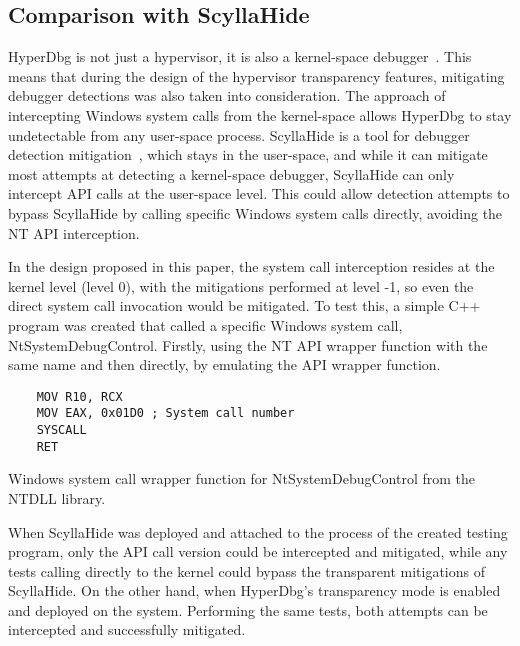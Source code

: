 \subsection{Comparison with ScyllaHide}\label{scyllahide-comparison}
HyperDbg is not just a hypervisor, it is also a kernel-space debugger~\cite{karvandi2022hyperdbg}. This means that during the design of 
the hypervisor transparency features, mitigating debugger detections was also taken into consideration. The approach of intercepting Windows system calls 
from the kernel-space allows HyperDbg to stay undetectable from any user-space process. ScyllaHide is a tool for debugger detection mitigation~\cite{scyllahide}, 
which stays in the user-space, and while it can mitigate most attempts at detecting a kernel-space debugger, ScyllaHide can only intercept API calls at the user-space level. 
This could allow detection attempts to bypass ScyllaHide by calling specific Windows system calls directly, avoiding the NT API interception. 

In the design proposed in this paper, the system call interception resides at the kernel level (level 0), with the mitigations performed at level -1, 
so even the direct system call invocation would be mitigated. To test this, a simple C++ program was created that called a specific Windows system call, 
NtSystemDebugControl. Firstly, using the NT API wrapper function with the same name and then directly, by emulating the API wrapper function.
\begin{listing}[!ht]

\begin{verbatim}
    MOV R10, RCX
    MOV EAX, 0x01D0 ; System call number
    SYSCALL
    RET
\end{verbatim}
\caption{Windows system call wrapper function for NtSystemDebugControl from the NTDLL library.}
\label{lst:syscall-wrapper}
\end{listing}
When ScyllaHide was deployed and attached to the process of the created testing program, only the API call version could be intercepted and mitigated, 
while any tests calling directly to the kernel could bypass the transparent mitigations of ScyllaHide.
On the other hand, when HyperDbg's transparency mode is enabled and deployed on the system. Performing the same tests, both attempts can be intercepted and 
successfully mitigated.



